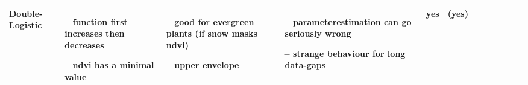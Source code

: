 \begin{table}[!ht]
\begin{tabular}{p{1.6cm}p{3.3cm}p{3.3cm}p{3.4cm}p{0.4cm}p{0.4cm}p{3cm}p{3cm}p{3cm}p{3cm}p{3cm}p{3cm}|}

		Double-Logistic                                                                                                                                              &
		\begin{cptitemize} \item[--]  function first increases then decreases \item[--]  ndvi has a minimal value                            \end{cptitemize}        &
		\begin{cptitemize} \item[--]  good for evergreen plants (if snow masks ndvi) \item[--] upper envelope                                \end{cptitemize}        &
		\begin{cptitemize} \item[--]  parameterestimation can go seriously wrong \item[--]  strange behaviour for long data-gaps             \end{cptitemize}        &
		yes                                                                                                                                                          &
		(yes)                                                                                                                                                         \\ \hline%


\end{tabular}
\end{table}

